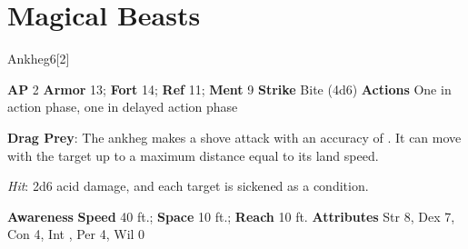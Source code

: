\section{Magical Beasts}
\begin{monsection}{Ankheg}{6}[2]
\vspace{-1em}\vspace{-1em}
\begin{spellcontent}
\begin{spelltargetinginfo}
{\textbf{AP} 2}
\pari \textbf{Armor} 13;
\textbf{Fort} 14;
\textbf{Ref} 11;
\textbf{Ment} 9
\pari \textbf{Strike} Bite  (4d6)
\pari \textbf{Actions} One in action phase, one in delayed action phase
\end{spelltargetinginfo}
\begin{spelleffects}
\pari
\textbf{Drag Prey}:
The ankheg makes a shove attack with an accuracy of .
It can move with the target up to a maximum distance equal to its land speed.
\vspace{0.5em}
\pari
{}
\par
\par \textit{Hit}: 2d6 acid damage, and each target is sickened as a condition.
\end{spelleffects}
\end{spellcontent}
\begin{spellsubcontent}
\begin{spellfooter}
\pari \textbf{Awareness} 
\pari \textbf{Speed} 40 ft.;
\textbf{Space} 10 ft.;
\textbf{Reach} 10 ft.
\pari \textbf{Attributes}
Str 8,
Dex 7,
Con 4,
Int ,
Per 4,
Wil 0
\end{spellfooter}
\end{spellsubcontent}
\end{monsection}
